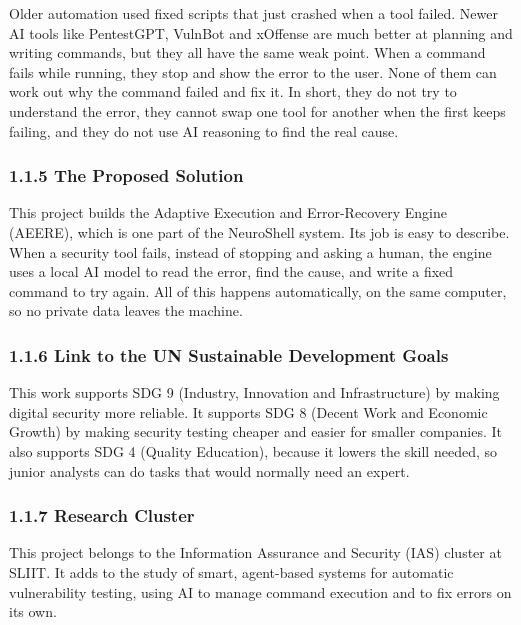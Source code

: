 \documentclass[
]{article}
\begin{document}
Older automation used fixed scripts that just crashed when a tool
failed. Newer AI tools like PentestGPT, VulnBot and xOffense are much
better at planning and writing commands, but they all have the same weak
point. When a command fails while running, they stop and show the error
to the user. None of them can work out why the command failed and fix
it. In short, they do not try to understand the error, they cannot swap
one tool for another when the first keeps failing, and they do not use
AI reasoning to find the real cause.

\hypertarget{the-proposed-solution}{%
\subsubsection{1.1.5 The Proposed
Solution}\label{the-proposed-solution}}

This project builds the Adaptive Execution and Error-Recovery Engine
(AEERE), which is one part of the NeuroShell system. Its job is easy to
describe. When a security tool fails, instead of stopping and asking a
human, the engine uses a local AI model to read the error, find the
cause, and write a fixed command to try again. All of this happens
automatically, on the same computer, so no private data leaves the
machine.

\hypertarget{link-to-the-un-sustainable-development-goals}{%
\subsubsection{1.1.6 Link to the UN Sustainable Development
Goals}\label{link-to-the-un-sustainable-development-goals}}

This work supports SDG 9 (Industry, Innovation and Infrastructure) by
making digital security more reliable. It supports SDG 8 (Decent Work
and Economic Growth) by making security testing cheaper and easier for
smaller companies. It also supports SDG 4 (Quality Education), because
it lowers the skill needed, so junior analysts can do tasks that would
normally need an expert.

\hypertarget{research-cluster}{%
\subsubsection{1.1.7 Research Cluster}\label{research-cluster}}

This project belongs to the Information Assurance and Security (IAS)
cluster at SLIIT. It adds to the study of smart, agent-based systems for
automatic vulnerability testing, using AI to manage command execution
and to fix errors on its own.
\end{document}
